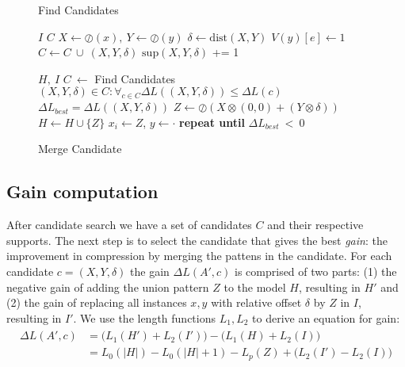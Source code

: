 \documentclass{llncs}
\begin{document}
\begin{figure*}[t!]
\vspace{-\baselineskip}
\begin{minipage}[t]{.45\textwidth}
	\begin{algorithm}[H]
	\caption{Find Candidates}
	\begin{algorithmic}[1]
	\Require $I$
	\Ensure $C$
			\State $X \gets \oslash(x), \ Y \gets \oslash(y)$
			\State $\delta \gets \mathrm{dist}(X,Y)$
				\State $V(y)[e] \gets 1$
			\EndIf
			\State $C \gets C \ \cup \ (X,Y,\delta)$
			\State $\mathrm{sup}(X,Y,\delta)$ += 1
		\EndFor
	\EndFor
	\end{algorithmic}
	\end{algorithm}%
\end{minipage}%
\begin{minipage}[t]{.55\textwidth}
	\begin{algorithm}[H]
	\caption{Merge Candidate}
	\label{alg:vouw}
	\begin{algorithmic}[1]
	\Require $H,\ I$
		\State $C \ \gets$ Find Candidates
		\State $(X,Y,\delta) \in C : \forall_{c \in C} \Delta L((X,Y,\delta)) \leq \Delta L(c)$
	\State $\Delta L_{best} = \Delta L((X,Y,\delta))$
		\State $Z \gets \oslash(X\otimes(0,0) + (Y\otimes\delta))$
		\State $H \gets H \cup \{Z\}$
				\State $x_i \gets Z$,  $y \gets \cdot$
			\EndFor
		\EndFor
	\EndIf
	\State \textbf{repeat until} $\Delta L_{best} \ < \ 0$
	\end{algorithmic}%
	\vspace{-2pt}
	\end{algorithm}
\end{minipage}
\end{figure*}

\subsection{Gain computation}

After candidate search we have a set of candidates $C$ and their respective supports. The next step is to select the candidate that gives the best \emph{gain}: the improvement in compression by merging the pattens in the candidate. For each candidate $c=(X,Y,\delta)$ the gain $\Delta L(A',c)$  is comprised of two parts: (1) the negative gain of adding the union pattern $Z$ to the model $H$, resulting in $H'$ and (2) the gain of replacing all instances $x,y$ with relative offset $\delta$ by $Z$ in $I$, resulting in $I'$. We use the length functions $L_1, L_2$ to derive an equation for gain:
\begin{align}
\label{gain}
\begin{split}
	\Delta L(A',c) &= \Big(L_1(H') + L_2(I') \Big) - \Big(L_1(H) + L_2(I) \Big) \\
			    &= L_0(|H|) - L_0(|H|+1) - L_p(Z) + \Big(L_2(I') - L_2(I) \Big)
\end{split}
\end{align}
\end{document}
